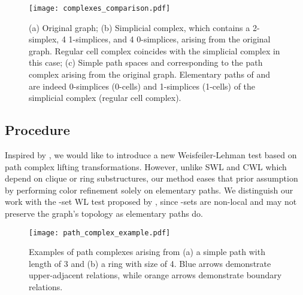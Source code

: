 \documentclass[letterpaper]{article} \usepackage{aaai24}  \usepackage{times}  \usepackage{helvet}  \usepackage{courier}  \usepackage[hyphens]{url}  \usepackage{graphicx} \urlstyle{rm} \def\UrlFont{\rm}  \usepackage{natbib}  \usepackage{caption} \frenchspacing  \setlength{\pdfpagewidth}{8.5in} \setlength{\pdfpageheight}{11in} \usepackage{algorithm}
\begin{document}
\begin{figure}
    \centering
    \texttt{[image: complexes\_comparison.pdf]}
    \caption{(a) Original graph; (b) Simplicial complex, which contains a 2-simplex, 4 1-simplices, and 4 0-simplices, arising from the original graph. Regular cell complex coincides with the simplicial complex in this case; (c) Simple path spaces  and  corresponding to the path complex arising from the original graph. Elementary paths of  and  are indeed 0-simplices (0-cells) and 1-simplices (1-cells) of the simplicial complex (regular cell complex). }
    \label{fig:complexes_comparison}
\end{figure}

\subsection{Procedure} \label{subsec:procedure}
Inspired by \cite{bodnar_weisfeiler_2021, bodnar_weisfeiler_2022}, we would like to introduce a new Weisfeiler-Lehman test based on path complex lifting transformations. However, unlike SWL\cite{bodnar_weisfeiler_2021} and CWL \cite{bodnar_weisfeiler_2022} which depend on clique or ring substructures, our method eases that prior assumption by performing color refinement solely on elementary paths. We distinguish our work with the -set WL test proposed by \cite{morris_weisfeiler_2019}, since -sets are non-local and may not preserve the graph's topology as elementary paths do.

\begin{figure}[t]
    \centering
    \texttt{[image: path\_complex\_example.pdf]}
    \caption{Examples of path complexes arising from (a) a simple path with length of 3 and (b) a ring with size of 4. Blue arrows demonstrate upper-adjacent relations, while orange arrows demonstrate boundary relations.}
    \label{fig:path_complex_example}
\end{figure}
\end{document}
